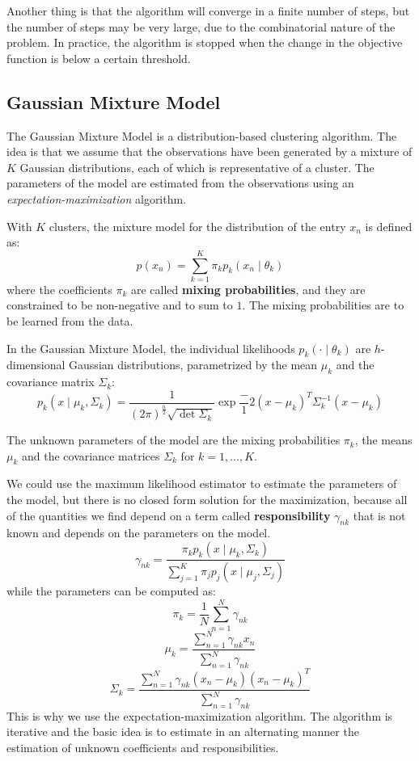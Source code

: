 
Another thing is that the algorithm will converge in a finite number of steps, but the number of steps may be very large, due to the combinatorial nature of the problem. In practice, the algorithm is stopped when the change in the objective function is below a certain threshold.

\subsection*{Gaussian Mixture Model}
The Gaussian Mixture Model is a distribution-based clustering algorithm. The idea is that we assume that the observations have been generated by a mixture of $K$ Gaussian distributions, each of which is representative of a cluster. The parameters of the model are estimated from the observations using an \textit{expectation-maximization} algorithm.

With $K$ clusters, the mixture model for the distribution of the entry $x_n$ is defined as:
\[
    p(x_n) = \sum_{k=1}^{K} \pi_k p_k (x_n \mid \theta_k)
\]
where the coefficients $\pi_k$ are called \textbf{mixing probabilities}, and they are constrained to be non-negative and to sum to $1$. The mixing probabilities are to be learned from the data.

In the Gaussian Mixture Model, the individual likelihoods $p_k(\cdot \mid \theta_k)$ are $h$-dimensional Gaussian distributions, parametrized by the mean $\mu_k$ and the covariance matrix $\Sigma_k$:
\[
    p_k(x \mid \mu_k, \Sigma_k) = \frac{1}{(2\pi)^{\frac{h}{2}} \sqrt{\det \Sigma_k}} \exp{\frac-{1}{2}(x-\mu_k)^T \Sigma_k^{-1} (x-\mu_k)}
\]

The unknown parameters of the model are the mixing probabilities $\pi_k$, the means $\mu_k$ and the covariance matrices $\Sigma_k$ for $k=1, \ldots, K$.

We could use the maximum likelihood estimator to estimate the parameters of the model, but there is no closed form solution for the maximization, because all of the quantities we find depend on a term called \textbf{responsibility} $\gamma_{nk}$ that is not known and depends on the parameters on the model.
\[
    \gamma_{nk} = \frac{\pi_k p_k(x \mid \mu_k, \Sigma_k)}{\sum_{j=1}^{K} \pi_j p_j(x \mid \mu_j, \Sigma_j)}
\]
while the parameters can be computed as:
\[
    \pi_k = \frac{1}{N} \sum_{n=1}^{N} \gamma_{nk}
\]
\[
    \mu_k = \frac{\sum_{n=1}^{N} \gamma_{nk} x_n}{\sum_{n=1}^{N} \gamma_{nk}}
\]
\[
    \Sigma_k = \frac{\sum_{n=1}^{N} \gamma_{nk} (x_n - \mu_k)(x_n - \mu_k)^T}{\sum_{n=1}^{N} \gamma_{nk}}
\]
This is why we use the expectation-maximization algorithm. The algorithm is iterative and the basic idea is to estimate in an alternating manner the estimation of unknown coefficients and responsibilities.

